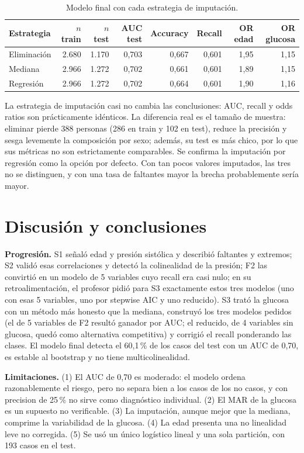 \documentclass[11pt,a4paper]{article}
\begin{document}
\begin{table}[H]
\centering\small
\caption{Modelo final con cada estrategia de imputación.}\label{tab:imp}
\begin{tabular}{@{}lrrrrrrr@{}}
\toprule
\textbf{Estrategia} & \textbf{$n$ train} & \textbf{$n$ test} & \textbf{AUC test} & \textbf{Accuracy} & \textbf{Recall} & \textbf{OR edad} & \textbf{OR glucosa} \\
\midrule
Eliminación & 2.680 & 1.170 & 0,703 & 0,667 & 0,601 & 1,95 & 1,15 \\
Mediana     & 2.966 & 1.272 & 0,702 & 0,661 & 0,601 & 1,89 & 1,15 \\
Regresión   & 2.966 & 1.272 & 0,702 & 0,664 & 0,601 & 1,90 & 1,16 \\
\bottomrule
\end{tabular}
\end{table}

La estrategia de imputación casi no cambia las conclusiones: AUC, recall y odds ratios son prácticamente idénticos. La diferencia real es el tamaño de muestra: eliminar pierde 388 personas (286 en train y 102 en test), reduce la precisión y sesga levemente la composición por sexo; además, su test es más chico, por lo que sus métricas no son estrictamente comparables. Se confirma la imputación por regresión como la opción por defecto. Con tan pocos valores imputados, las tres no se distinguen, y con una tasa de faltantes mayor la brecha probablemente sería mayor.

\section{Discusión y conclusiones}
\textbf{Progresión.} S1 señaló edad y presión sistólica y describió faltantes y extremos; S2 validó esas correlaciones y detectó la colinealidad de la presión; F2 las convirtió en un modelo de 5 variables cuyo recall era casi nulo; en su retroalimentación, el profesor pidió para S3 exactamente estos tres modelos (uno con esas 5 variables, uno por stepwise AIC y uno reducido). S3 trató la glucosa con un método más honesto que la mediana, construyó los tres modelos pedidos (el de 5 variables de F2 resultó ganador por AUC; el reducido, de 4 variables sin glucosa, quedó como alternativa competitiva) y corrigió el recall ponderando las clases. El modelo final detecta el 60,1\,\% de los casos del test con un AUC de 0,70, es estable al bootstrap y no tiene multicolinealidad.

\textbf{Limitaciones.} (1) El AUC de 0,70 es moderado: el modelo ordena razonablemente el riesgo, pero no separa bien a los casos de los no casos, y con precision de 25\,\% no sirve como diagnóstico individual. (2) El MAR de la glucosa es un supuesto no verificable. (3) La imputación, aunque mejor que la mediana, comprime la variabilidad de la glucosa. (4) La edad presenta una no linealidad leve no corregida. (5) Se usó un único logístico lineal y una sola partición, con 193 casos en el test.
\end{document}
